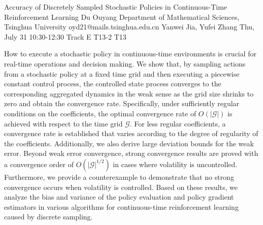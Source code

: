 \begin{talk}
  {Accuracy of Discretely Sampled Stochastic Policies in Continuous-Time Reinforcement Learning}%
  {Du Ouyang}%
  {Department of Mathematical Sciences, Tsinghua University}%
  {oyd21@mails.tsinghua.edu.cn}%
  {Yanwei Jia, Yufei Zhang}%
  {}%
  {Thu, July 31 10:30-12:30 Track E}%
  {T13-2}%
  {T13}%
			


\medskip

How to execute a stochastic policy in continuous-time environments is crucial for real-time operations and decision making. We show that, by sampling actions from a stochastic policy at a fixed time grid and then executing a piecewise constant control process, the controlled state process converges to the corresponding aggregated dynamics in the weak sense as the grid size shrinks to zero and obtain the convergence rate. Specifically, under sufficiently regular conditions on the coefficients, the optimal convergence rate of $O(|\mathscr{G}|)$ is achieved with respect to the time grid $\mathscr{G}$. For less regular coefficients, a convergence rate is established that varies according to the degree of regularity of the coefficients. Additionally, we also derive large deviation bounds for the weak error. Beyond weak error convergence, strong convergence results are proved with a convergence order of $O(|\mathscr{G}|^{1/2})$ in cases where volatility is uncontrolled. Furthermore, we provide a counterexample to demonstrate that no strong convergence occurs when volatility is controlled. Based on these results, we analyze the bias and variance of the policy evaluation and policy gradient estimators in various algorithms for continuous-time reinforcement learning caused by discrete sampling.


\end{talk}

